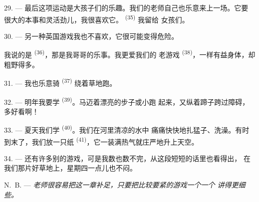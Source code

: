 29. --- 最后这项运动是大孩子们的乐趣。我们的老师自己也乐意来上一场。它要
很大的本事和灵活劲儿，我很喜欢它。 \textsuperscript{(35)} 我留给
女孩们。

30. --- 另一种英国游戏我也不喜欢，它很可能变得危险。

我说的是 \textsuperscript{(36)}，那是我哥哥的乐事。我更爱我们的
老游戏 \textsuperscript{(38)}，一样有益身体，却粗野得多。

\VUsaut{4.6mm}
\VUsaut{3.0mm}

31. --- 我也乐意骑 \textsuperscript{(37)} 绕着草地跑。

32. --- 明年我要学 \textsuperscript{(39)}。马迈着漂亮的步子或小跑
起来，又纵着蹄子跨过障碍，多好看啊！

33. --- 夏天我们学 \textsuperscript{(40)}。我们在河里清凉的水中
痛痛快快地扎猛子、洗澡。有时到末了，我们放一只纸
\textsuperscript{(41)}，它一装满热气就庄严地升上天空。

34. --- 还有许多别的游戏，可是我数也数不完，从这段短短的话里也看得出，
在我们那片好草地上，星期四一点儿也不闷。

N.~B. --- \textit{老师很容易把这一章补足，只要把比较要紧的游戏一个一个
讲得更细些。}
\VUsaut{6.0mm}
\VUfilet{22mm}
